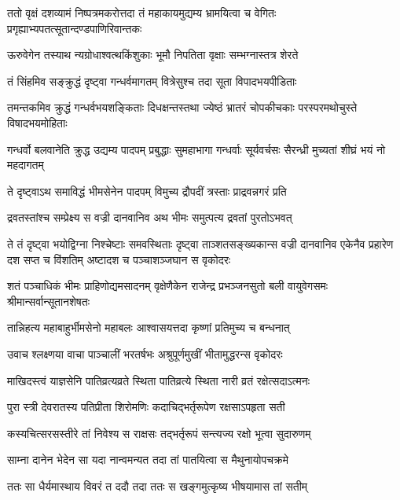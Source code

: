 \onelineshloka
{ततो वृक्षं दशव्यामं निष्पत्रमकरोत्तदा}
\twolineshloka
{तं महाकायमुद्यम्य भ्रामयित्वा च वेगितः}
{प्रगृह्याभ्यपतत्सूतान्दण्डपाणिरिवान्तकः}


\twolineshloka
{ऊरुवेगेन तस्याथ न्यग्रोधाश्वत्थकिंशुकाः}
{भूमौ निपतिता वृक्षाः सम्भग्नास्तत्र शेरते}


\twolineshloka
{तं सिंहमिव सङ्क्रुद्धं दृष्ट्वा गन्धर्वमागतम्}
{वित्रेसुश्च तदा सूता विपादभयपीडिताः}


\threelineshloka
{तमन्तकमिव क्रुद्धं गन्धर्वभयशङ्किताः}
{दिधक्षन्तस्तथा ज्येष्ठं भ्रातरं चोपकीचकाः}
{परस्परमथोचुस्ते विषादभयमोहिताः}


\threelineshloka
{गन्धर्वो बलवानेति क्रुद्ध उद्यम्य पादपम्}
{प्रबुद्धाः सुमहाभागा गन्धर्वाः सूर्यवर्चसः}
{सैरन्ध्री मुच्यतां शीघ्रं भयं नो महदागतम्}



\twolineshloka
{ते दृष्ट्वाऽथ समाविद्धं भीमसेनेन पादपम्}
{विमुच्य द्रौपदीं त्रस्ताः प्राद्रवन्नगरं प्रति}


\twolineshloka
{द्रवतस्तांश्च सम्प्रेक्ष्य स वज्री दानवानिव}
{अथ भीमः समुत्पत्य द्रवतां पुरतोऽभवत्}


\onelineshloka
{ते तं दृष्ट्वा भयोद्विग्ना निश्चेष्टाः समवस्थिताः}
\threelineshloka
{दृष्ट्वा ताञ्शतसङ्ख्यकान्स वज्री दानवानिव}
{एकेनैव प्रहारेण दश सप्त च विंशतिम्}
{अष्टादश च पञ्चाशञ्जघान स वृकोदरः}


\threelineshloka
{शतं पञ्चाधिकं भीमः प्राहिणोद्यमसादनम्}
{वृक्षेणैकेन राजेन्द्र प्रभञ्जनसुतो बली}
{वायुवेगसमः श्रीमान्सर्वान्सूतानशेषतः}


\twolineshloka
{तान्निहत्य महाबाहुर्भीमसेनो महाबलः}
{आश्वासयत्तदा कृष्णां प्रतिमुच्य च बन्धनात्}


\twolineshloka
{उवाच श्लक्ष्णया वाचा पाञ्चालीं भरतर्षभः}
{अश्रुपूर्णमुखीं भीतामुद्धरन्स वृकोदरः}


\twolineshloka
{माखिदस्त्वं याज्ञसेनि पातिव्रत्यव्रते स्थिता}
{पातिव्रत्ये स्थिता नारी व्रतं रक्षेत्सदाऽत्मनः}


\twolineshloka
{पुरा स्त्री देवरातस्य पतिप्रीता शिरोमणिः}
{कदाचिद्भर्तृरूपेण रक्षसाऽपहृता सती}


\twolineshloka
{कस्यचित्सरसस्तीरे तां निवेश्य स राक्षसः}
{तद्भर्तृरूपं सन्त्यज्य रक्षो भूत्वा सुदारुणम्}


\twolineshloka
{साम्ना दानेन भेदेन सा यदा नान्वमन्यत}
{तदा तां पातयित्वा स मैथुनायोपचक्रमे}


\twolineshloka
{ततः सा धैर्यमास्थाय विवरं त ददौ तदा}
{ततः स खङ्गमुत्कृष्य भीषयामास तां सतीम्}


